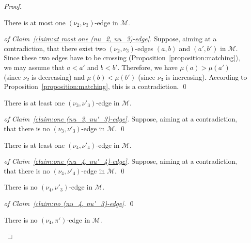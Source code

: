 \documentclass[a4paper,10pt]{llncs}
\begin{document}
\begin{proof}
  \begin{claim}
    \label{claim:at most one (nu_2, nu_3)-edge}
    There is at most one $(\nu_2, \nu_3)$-edge
    in $\mathcal{M}$.
  \end{claim}

  \begin{proof}[of Claim~\ref{claim:at most one (nu_2, nu_3)-edge}]
    Suppose, aiming at a contradiction, that there exist two
    $(\nu_2, \nu_3)$-edges $(a, b)$ and $(a', b')$ in $\mathcal{M}$.
    Since these two edges have to be crossing
    (Proposition~\ref{proposition:matching}), we may assume that
    $a < a'$ and $b < b'$.
    Therefore, we have
    $\mu(a) > \mu(a')$ (since $\nu_2$ is decreasing)
    and
    $\mu(b) < \mu(b')$ (since $\nu_3$ is increasing).
    According to Proposition~\ref{proposition:matching}, this is
    a contradiction.
    \qed
  \end{proof}

  \begin{claim}
    \label{claim:one (nu_3, nu'_3)-edge}
    There is at least one $(\nu_3, \nu'_3)$-edge in $\mathcal{M}$.
  \end{claim}

  \begin{proof}[of Claim~\ref{claim:one (nu_3, nu'_3)-edge}]
    Suppose, aiming at a contradiction, that there is no
    $(\nu_3, \nu'_3)$-edge in $\mathcal{M}$.
    \qed
  \end{proof}

  \begin{claim}
    \label{claim:one (nu_4, nu'_4)-edge}
    There is at least one $(\nu_4, \nu'_4)$-edge in $\mathcal{M}$.
  \end{claim}

  \begin{proof}[of Claim~\ref{claim:one (nu_4, nu'_4)-edge}]
    Suppose, aiming at a contradiction, that there is no
    $(\nu_4, \nu'_4)$-edge in $\mathcal{M}$.
    \qed
  \end{proof}

  \begin{claim}
    \label{claim:no (nu_4, nu'_3)-edge}
    There is no $(\nu_4, \nu'_3)$-edge in $\mathcal{M}$.
  \end{claim}

  \begin{proof}[of Claim~\ref{claim:no (nu_4, nu'_3)-edge}]
    \qed
  \end{proof}

  \begin{claim}
    \label{claim:no (nu_4, pi')-edge}
    There is no $(\nu_4, \pi')$-edge in $\mathcal{M}$.
  \end{claim}


\end{proof}
\end{document}
